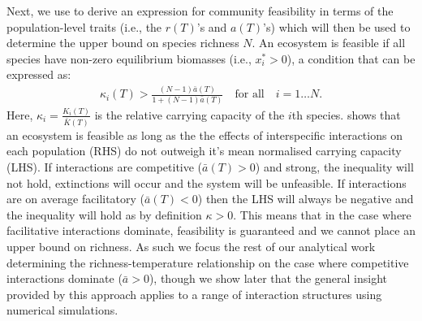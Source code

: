 \documentclass{article}
\begin{document}
Next, we use  to derive an expression for community feasibility in terms of the population-level traits (i.e., the $r(T)$'s and $a(T)$'s) which will then be used to determine the upper bound on species richness $N$. An ecosystem is feasible if all species have non-zero equilibrium biomasses (i.e., $x_i^* > 0 $), a condition that can be expressed as:
\begin{align} \label{EQ:Feas_sp}
  \kappa_i(T) > \frac{(N-1)\bar{a}(T)}{1 + (N-1)\bar{a}(T)} \quad \text{for all} \quad i = 1 \ldots N.
\end{align}
Here, $\kappa_i = \frac{K_i(T)}{\bar{K}(T)}$ is the relative carrying capacity of the $i$th species.  shows that an ecosystem is feasible as long as the the effects of interspecific interactions on each population (RHS) do not outweigh it's mean normalised carrying capacity (LHS). If interactions are competitive ($\bar{a}(T) > 0$) and strong, the inequality will not hold, extinctions will occur and the system will be unfeasible. If interactions are on average facilitatory ($\bar{a}(T) < 0$) then the LHS will always be negative and the inequality will hold as by definition $\kappa > 0$. This means that in the case where facilitative interactions dominate, feasibility is guaranteed and we cannot place an upper bound on richness. As such we focus the rest of our analytical work determining the richness-temperature relationship on the case where competitive interactions dominate ($\bar{a} > 0$), though we show later that the general insight provided by this approach applies to a range of interaction structures using numerical simulations. 
\end{document}

